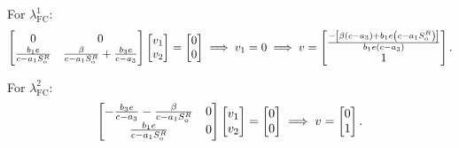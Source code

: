 \documentclass[
    8pt,
    aspectratio=1610,
    c,
    intlimits,
    leqno,
    professionalfonts,
]{beamer}
\begin{document}
\begin{frame}
	For $\lambda^{1}_{\text{FC}}$:
	\begin{equation*}
		\begin{bmatrix}
			0                                      & 0                                                            \\[.5\baselineskip]
			\frac{b_{1}e}{c-a_{1}S^{R}_{\text{o}}} & \frac{\beta}{c-a_{1}S^{R}_{\text{o}}}+\frac{b_{3}e}{c-a_{3}}
		\end{bmatrix}
		\begin{bmatrix}
			v_{1} \\
			v_{2}
		\end{bmatrix}=
		\begin{bmatrix}
			0 \\
			0
		\end{bmatrix}\implies
		v_{1}=0\implies
		v=\begin{bmatrix}
			\frac{-\left[\beta\left(c-a_{3}\right)+b_{1}e\left(c-a_{1}S^{R}_{\text{o}}\right)\right]}{b_{1}e\left(c-a_{3}\right)} \\
			1
		\end{bmatrix}.
	\end{equation*}

	For $\lambda^{2}_{\text{FC}}$:
	\begin{equation*}
		\begin{bmatrix}
			-\frac{b_{3}e}{c-a_{3}}-\frac{\beta}{c-a_{1}S^{R}_{\text{o}}} & 0 \\[.5\baselineskip]
			\frac{b_{1}e}{c-a_{1}S^{R}_{\text{o}}}                        & 0
		\end{bmatrix}
		\begin{bmatrix}
			v_{1} \\
			v_{2}
		\end{bmatrix}=
		\begin{bmatrix}
			0 \\
			0
		\end{bmatrix}\implies
		v=\begin{bmatrix}
			0 \\
			1
		\end{bmatrix}.
	\end{equation*}
\end{frame}
\end{document}
